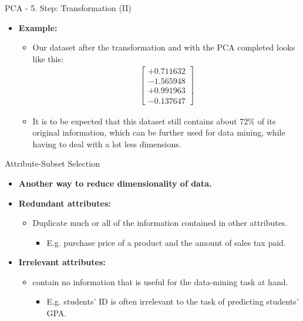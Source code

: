 \begin{frame}{PCA - 5. Step: Transformation (II)}
	\begin{itemize}
		\item \textbf{Example:}
		      \begin{itemize}
			      \item Our dataset after the transformation and with the PCA
			            completed looks like this: \\
			            \begin{align*}
				            \begin{bmatrix} +0.711632 \\ -1.565948 \\ +0.991963 \\ -0.137647
				            \end{bmatrix}
			            \end{align*}
			      \item It is to be expected that this dataset still contains about
			            $72\%$ of its original information, which can be
			            further used for data mining, while having to deal with
			            a lot less dimensions.
		      \end{itemize}
	\end{itemize}
\end{frame}

\begin{frame}{Attribute-Subset Selection}
	\begin{itemize}
		\item \textbf{Another way to reduce dimensionality of data.}
		\item\textbf{\color{airforceblue}Redundant attributes:}
		      \begin{itemize}
			      \item Duplicate much or all of the information contained in other
			            attributes.
			            \begin{itemize}
				            \item E.g. purchase price of a product and the amount of sales
				                  tax paid.
			            \end{itemize}
		      \end{itemize}
		\item \textbf{\color{airforceblue}Irrelevant attributes:}
		      \begin{itemize}
			      \item contain no information that is useful for the data-mining
			            task at hand.
			            \begin{itemize}
				            \item E.g. students' ID is often irrelevant to the task of
				                  predicting students' GPA.
			            \end{itemize}
		      \end{itemize}
	\end{itemize}
\end{frame}

